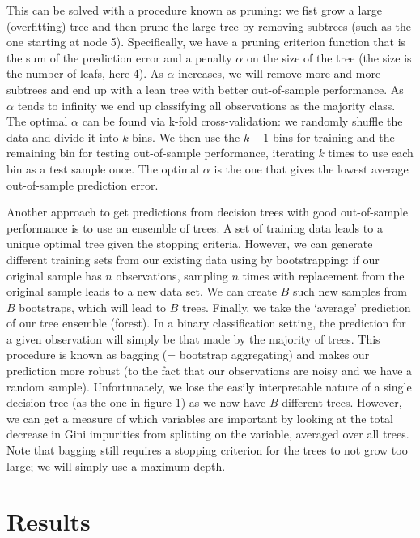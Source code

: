 \documentclass[
]{article}
\begin{document}
This can be solved with a procedure known as pruning: we fist grow a
large (overfitting) tree and then prune the large tree by removing
subtrees (such as the one starting at node 5). Specifically, we have a
pruning criterion function that is the sum of the prediction error and a
penalty \(\alpha\) on the size of the tree (the size is the number of
leafs, here 4). As \(\alpha\) increases, we will remove more and more
subtrees and end up with a lean tree with better out-of-sample
performance. As \(\alpha\) tends to infinity we end up classifying all
observations as the majority class. The optimal \(\alpha\) can be found
via k-fold cross-validation: we randomly shuffle the data and divide it
into \(k\) bins. We then use the \(k-1\) bins for training and the
remaining bin for testing out-of-sample performance, iterating \(k\)
times to use each bin as a test sample once. The optimal \(\alpha\) is
the one that gives the lowest average out-of-sample prediction error.

Another approach to get predictions from decision trees with good
out-of-sample performance is to use an ensemble of trees. A set of
training data leads to a unique optimal tree given the stopping
criteria. However, we can generate different training sets from our
existing data using by bootstrapping: if our original sample has \(n\)
observations, sampling \(n\) times with replacement from the original
sample leads to a new data set. We can create \(B\) such new samples
from \(B\) bootstraps, which will lead to \(B\) trees. Finally, we take
the `average' prediction of our tree ensemble (forest). In a binary
classification setting, the prediction for a given observation will
simply be that made by the majority of trees. This procedure is known as
bagging (= bootstrap aggregating) and makes our prediction more robust
(to the fact that our observations are noisy and we have a random
sample). Unfortunately, we lose the easily interpretable nature of a
single decision tree (as the one in figure 1) as we now have \(B\)
different trees. However, we can get a measure of which variables are
important by looking at the total decrease in Gini impurities from
splitting on the variable, averaged over all trees. Note that bagging
still requires a stopping criterion for the trees to not grow too large;
we will simply use a maximum depth.

\hypertarget{results}{%
\section{Results}\label{results}}
\end{document}

